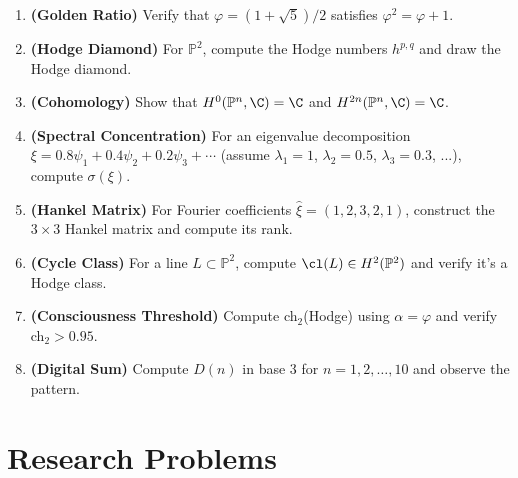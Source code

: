 \begin{enumerate}
\item \textbf{(Golden Ratio)} Verify that $\varphi = (1+\sqrt{5})/2$ satisfies $\varphi^2 = \varphi + 1$.

\item \textbf{(Hodge Diamond)} For $\mathbb{P}^2$, compute the Hodge numbers $h^{p,q}$ and draw the Hodge diamond.

\item \textbf{(Cohomology)} Show that $H^0(\mathbb{P}^n, \C) = \C$ and $H^{2n}(\mathbb{P}^n, \C) = \C$.

\item \textbf{(Spectral Concentration)} For an eigenvalue decomposition $\xi = 0.8\psi_1 + 0.4\psi_2 + 0.2\psi_3 + \cdots$ (assume $\lambda_1 = 1$, $\lambda_2 = 0.5$, $\lambda_3 = 0.3$, ...), compute $\sigma(\xi)$.

\item \textbf{(Hankel Matrix)} For Fourier coefficients $\hat{\xi} = (1, 2, 3, 2, 1)$, construct the $3 \times 3$ Hankel matrix and compute its rank.

\item \textbf{(Cycle Class)} For a line $L \subset \mathbb{P}^2$, compute $\cl(L) \in H^2(\mathbb{P}^2)$ and verify it's a Hodge class.

\item \textbf{(Consciousness Threshold)} Compute ch$_2$(Hodge) using $\alpha = \varphi$ and verify ch$_2 > 0.95$.

\item \textbf{(Digital Sum)} Compute $D(n)$ in base 3 for $n = 1, 2, \ldots, 10$ and observe the pattern.
\end{enumerate}

\section*{Research Problems}

